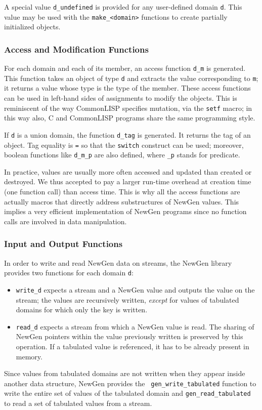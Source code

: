 A special value {\tt d\_undefined} is provided for any user-defined
domain {\tt d}.  This value may be used with the {\tt make\_<domain>}
functions to create partially initialized objects.

\subsubsection*{Access and Modification Functions}
For each domain and each of its member, an access function {\tt d\_m} is
generated. This function takes an object of type {\tt d} and extracts
the value corresponding to {\tt m}; it returns a value whose type is the
type of the member. These access functions can be used in left-hand
sides of assignments to modify the objects. This is reminiscent of the
way CommonLISP specifies mutation, via the {\tt setf} macro; in this way
also, C and CommonLISP programs share the same programming style.

If {\tt d} is a union domain, the function {\tt d\_tag} is generated.
It returns the tag of an object.  Tag equality is {\tt =} so that the
{\tt switch} construct can be used; moreover, boolean functions like
{\tt d\_m\_p} are also defined, where {\tt \_p} stands for predicate.

In practice, values are usually more often accessed and updated than
created or destroyed. We thus accepted to pay a larger run-time overhead
at creation time (one function call) than access time. This is why all
the access functions are actually macros that directly address
substructures of NewGen values. This implies a very efficient
implementation of NewGen programs since no function calls are involved
in data manipulation.

\subsubsection*{Input and Output Functions}
In order to write and read NewGen data on streams, the NewGen library
provides two functions for each domain {\tt d}:
\begin{itemize}
\item
	{\tt write\_d} expects a stream and a NewGen value and outputs
the value on the stream; the values are recursively written, {\em
except} for values of tabulated domains for which only the key is
written.
\item
	{\tt read\_d} expects a stream from which a NewGen value is
read. The sharing of NewGen pointers within the value previously written
is preserved by this operation. If a tabulated value is referenced, it
has to be already present in memory.
\end{itemize}
Since values from tabulated domains are not written when they appear
inside another data structure, NewGen provides the {\tt
gen\_write\_tabulated} function to write the entire set of values of the
tabulated domain and {\tt gen\_read\_tabulated} to read a set of
tabulated values from a stream.

